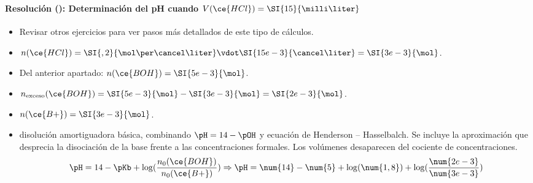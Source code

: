 \begin{frame}
	\frametitle{\ejerciciocmd}
	\framesubtitle{Resolución (): Determinación del pH cuando $V(\ce{HCl})=\SI{15}{\milli\liter}$}
	\begin{itemize}
		\item{} Revisar otros ejercicios para ver pasos más detallados de este tipo de cálculos.
		\item{} $n(\ce{HCl}) = \SI{,2}{\mol\per\cancel\liter}\vdot\SI{15e-3}{\cancel\liter}=\SI{3e-3}{\mol}$.
		\item\alert{Del anterior apartado:} $n(\ce{BOH})=\SI{5e-3}{\mol}$.
		\item{} $n_{\text{exceso}}(\ce{BOH})=\SI{5e-3}{\mol}-\SI{3e-3}{\mol}=\SI{2e-3}{\mol}$.
		\item{} $n(\ce{B+})=\SI{3e-3}{\mol}$.
		\item{} disolución amortiguadora básica, combinando $\pH=14-\pOH$ y ecuación de Henderson -- Hasselbalch. Se incluye la aproximación que desprecia la disociación de la base frente a las concentraciones formales. Los volúmenes desaparecen del cociente de concentraciones.
		$$
			\pH = 14 -\pKb + \log(\frac{n_0(\ce{BOH})}{n_0(\ce{B+})})\Rightarrow \pH=\num{14}-\num{5}+\log(\num{1,8})+\log(\frac{\num{2e-3}}{\num{3e-3}})
		$$
		\begin{center}
		\end{center}
	\end{itemize}
\end{frame}

